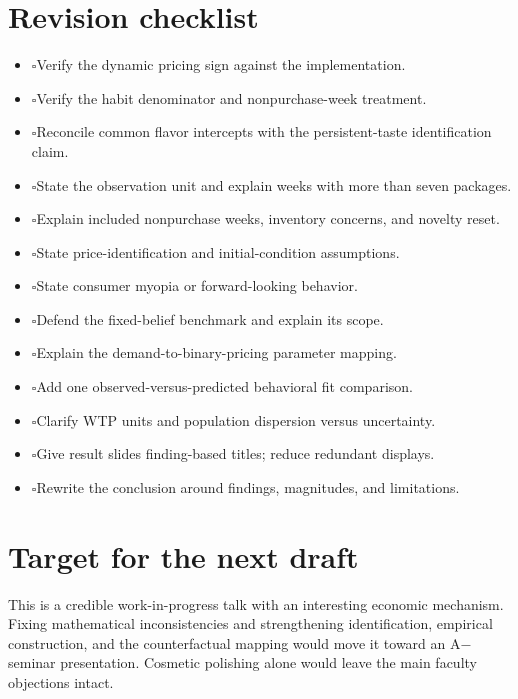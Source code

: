 \documentclass[11pt]{article}
\newcommand{\todo}{\(\square\)\quad}
\begin{document}
\section{Revision checklist}
\begin{itemize}[label={},itemsep=6pt]
\item \todo Verify the dynamic pricing sign against the implementation.
\item \todo Verify the habit denominator and nonpurchase-week treatment.
\item \todo Reconcile common flavor intercepts with the persistent-taste identification claim.
\item \todo State the observation unit and explain weeks with more than seven packages.
\item \todo Explain included nonpurchase weeks, inventory concerns, and novelty reset.
\item \todo State price-identification and initial-condition assumptions.
\item \todo State consumer myopia or forward-looking behavior.
\item \todo Defend the fixed-belief benchmark and explain its scope.
\item \todo Explain the demand-to-binary-pricing parameter mapping.
\item \todo Add one observed-versus-predicted behavioral fit comparison.
\item \todo Clarify WTP units and population dispersion versus uncertainty.
\item \todo Give result slides finding-based titles; reduce redundant displays.
\item \todo Rewrite the conclusion around findings, magnitudes, and limitations.
\end{itemize}

\section{Target for the next draft}
This is a credible work-in-progress talk with an interesting economic mechanism. Fixing mathematical inconsistencies and strengthening identification, empirical construction, and the counterfactual mapping would move it toward an A$-$ seminar presentation. Cosmetic polishing alone would leave the main faculty objections intact.
\end{document}
